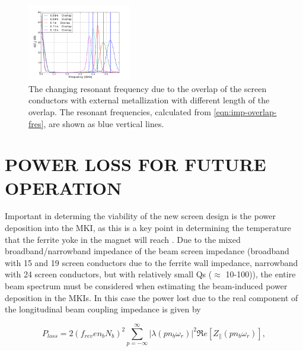 \documentclass{JAC2003}
\begin{document}
\begin{figure}
\begin{center}
\includegraphics[width=0.4\textwidth]{mki-overlap-len-real-imp-zoom.pdf}
\caption{The changing resonant frequency due to the overlap of the screen conductors with external metallization with different length of the overlap. The resonant frequencies, calculated from \ref{eqn:imp-overlap-fres}, are shown as blue vertical lines.}
\label{fig:mkiOverlapRes}
\end{center}
\end{figure}

\section{POWER LOSS FOR FUTURE OPERATION}

Important in determing the viability of the new screen design is the power deposition into the MKI, as this is a key point in determining the temperature that the ferrite yoke in the magnet will reach \cite{mki-heatingTemp}. Due to the mixed broadband/narrowband impedance of the beam screen impedance (broadband with 15 and 19 screen conductors due to the ferrite wall impedance, narrowband with 24 screen conductors, but with relatively small Qs ($\approx$ 10-100)), the entire beam spectrum must be considered when estimating the beam-induced power deposition in the MKIs. In this case the power lost due to the real component of the longitudinal beam coupling impedance is given by 

\begin{equation}
P_{loss} = 2 \left( f_{rev} e n_{b}  N_{b}\right)^{2} \displaystyle\sum\limits_{p = -\infty}^{\infty}  \left| \lambda \left( p n_{b} \omega_{r} \right)  \right|^{2} \Re{}e \left[ Z_{\parallel} \left( p n_{b}\omega_{r} \right) \right],
\label{eqn:heating-gen}
\end{equation} 
\end{document}
